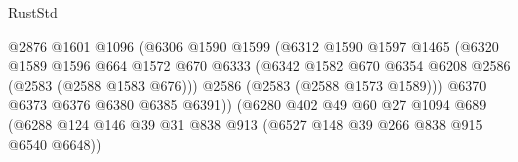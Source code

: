 \begin{lexlean}{RustStd}
\begin{coremodule}
                                            @2876
                                            @1601
                                            @1096
                                            (@6306
                                              @1590
                                              @1599
                                              (@6312
                                                @1590
                                                @1597
                                                @1465
                                                (@6320
                                                  @1589
                                                  @1596
                                                  @664
                                                  @1572
                                                  @670
                                                  @6333
                                                  (@6342
                                                    @1582
                                                    @670
                                                    @6354
                                                    @6208
                                                    @2586
                                                    (@2583 (@2588 @1583 @676)))
                                                  @2586
                                                  (@2583 (@2588 @1573 @1589)))
                                                @6370
                                                @6373
                                                @6376
                                                @6380
                                                @6385
                                                @6391))
                                            (@6280
                                              @402
                                              @49
                                              @60
                                              @27
                                              @1094
                                              @689
                                              (@6288
                                                @124
                                                @146
                                                @39
                                                @31
                                                @838
                                                @913
                                                (@6527 @148 @39 @266 @838 @915 @6540 @6648))

\end{coremodule}
\end{lexlean}
